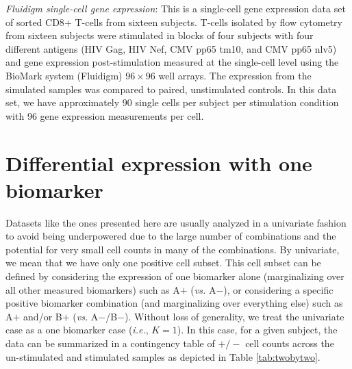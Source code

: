 \documentclass[12pt,oupdraft]{biostatistics}
\begin{document}
\textit{Fluidigm single-cell gene expression}: This is a single-cell gene expression data set of sorted CD8$+$ T-cells from sixteen subjects. T-cells isolated by flow cytometry from sixteen subjects were stimulated in blocks of four subjects with four different antigens (HIV Gag, HIV Nef, CMV pp65 tm10, and CMV pp65 nlv5) and gene expression post-stimulation measured at the single-cell level using the BioMark system (Fluidigm) $96 \times 96$ well arrays. The expression from the simulated samples  was compared to paired, unstimulated controls. In this data set, we have approximately 90 single cells per subject per stimulation condition with 96 gene expression measurements per cell.


\section{Differential expression with one biomarker}
\label{s:DEone}
Datasets like the ones presented here are usually analyzed in a univariate fashion to avoid being underpowered due to the large number of combinations and the potential for very small cell counts in many of the combinations. By univariate, we mean that we have only one positive cell subset. This cell subset can be defined by considering the expression of one biomarker alone (marginalizing over all other measured biomarkers) such as A$+$ (\textit{vs.} A$-$), or considering a specific positive biomarker combination (and marginalizing over everything else) such as A$+$ and/or B$+$ (\textit{vs.} A$-$/B$-$). Without loss of generality, we treat the univariate case as a one biomarker case (\textit{i.e.}, $K=1$). In this case, for a given subject, the data can be summarized in a contingency table of $+/-$ cell counts across the un-stimulated and stimulated samples as depicted in Table \ref{tab:twobytwo}.

%
\end{document}
